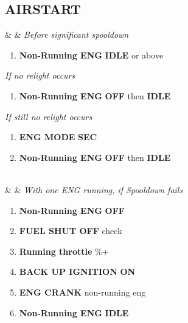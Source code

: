 \documentclass[fontInter]{TechCheck}
\begin{document}
	\subsection{AIRSTART}
	\begin{listlongtable}
		\textbf{\textbf{\textbullet}} &  & \emph{Before significant spooldown}
		\begin{minipage}[t]{\linewidth}
			\vspace{-7pt}
			\begin{enumerate}
				\item \textbf{Non-Running ENG} \dotfill \textbf{IDLE} or above
			\end{enumerate}
			\vspace{1em}
			\emph{If no relight occurs}
			\begin{enumerate}[resume]
				\vspace{-7pt}
				\item \textbf{Non-Running ENG} \dotfill \textbf{OFF} then \textbf{IDLE}
			\end{enumerate}
			\emph{If still no relight occurs}
			\begin{enumerate}[resume]
				\vspace{-7pt}
				\item \textbf{ENG MODE} \dotfill \textbf{SEC}
				\item \textbf{Non-Running ENG} \dotfill \textbf{OFF} then \textbf{IDLE}
			\end{enumerate}
		\end{minipage} \\
		\midrule
		\textbf{\textbf{\textbullet}} &  &
		\emph{With one ENG running, if Spooldown fails}
		\begin{minipage}[t]{\linewidth}
			\vspace{-7pt}
			\begin{enumerate}
				\item \textbf{Non-Running ENG} \dotfill \textbf{OFF}
				\item \textbf{FUEL SHUT OFF} \dotfill check
				\item \textbf{Running throttle} \%+
				\item \textbf{BACK UP IGNITION} \dotfill \textbf{ON}
				\item \textbf{ENG CRANK} \dotfill non-running eng
				\item \textbf{Non-Running ENG} \dotfill \textbf{IDLE}
			\end{enumerate}

\end{minipage}
\end{listlongtable}
\end{document}
